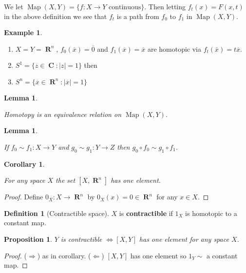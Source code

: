 \documentclass[10pt,]{article}
\newcommand{\terminology}[1]{\textbf{#1}}
\theoremstyle{plain}
\newtheorem{corollary}[theorem]{Corollary}
\newtheorem{lemma}[theorem]{Lemma}
\newtheorem{proposition}[theorem]{Proposition}
\theoremstyle{definition}
\newtheorem{definition}[theorem]{Definition}
\newtheorem{example}[theorem]{Example}
\DeclareMathOperator{\Map}{Map}
\DeclareMathOperator{\CC}{\mathbf{C}}
\DeclareMathOperator{\RR}{\mathbf{R}}
\begin{document}
                    We let \(\Map(X,Y) = \{f\colon X \to Y \text{ continuous}\}\).
                    Then letting \(f_t(x) = F(x,t)\) in the above definition we see that \(f_t\) is a
                    path from \(f_0\) to \(f_1\) in \(\Map(X,Y)\).
\begin{example}\label{example-1}
\begin{enumerate}
\item{}\(X = Y = \RR^n\), \(f_0(\overline{x}) = \overline{0}\) and \(f_1(\overline{x}) = \overline{x}\) are homotopic via \(f_t(\overline{x}) = t\overline{x}\).\item{}\(S^1 = \{z\in \CC : |z| = 1\}\) then \item{}\(S^n = \{ \overline{x} \in \RR^n : |\overline{x}| = 1\}\) \end{enumerate}
\end{example}
\begin{lemma}\label{lemma-1}

                        Homotopy is an equivalence relation on \(\Map(X,Y)\).
                    \end{lemma}
\label{notation-1}
\begin{lemma}\label{lemma-2}

                        If \(f_0 \sim f_1\colon X \to Y\) and \(g_0 \sim g_1\colon Y \to Z\) then
                        \(g_0\circ f_0 \sim g_1\circ f_1\).
                    \end{lemma}
\begin{corollary}\label{corollary-1}

                        For any space \(X\) the set \([X,\RR^n]\) has one element.
                    \end{corollary}
\begin{proof}

                        Define \(0_X\colon X \to \RR^n\) by \(0_X(x) = 0 \in \RR^n\) for any \(x\in X\).
                    \end{proof}
\begin{definition}[Contractible space]\label{definition-2}
\(X\) is \terminology{contractible} if \(1_X\) is homotopic to a constant map.
                    \end{definition}
\begin{proposition}\label{proposition-1}
\(Y\) is contractible \(\iff\)\([X,Y]\) has one element for any space \(X\).
                    \end{proposition}
\begin{proof}

                        (\(\Rightarrow\)) as in corollary.  (\(\Leftarrow\)) \([X,Y]\) has one element so
                        \(1_Y \sim \) a constant map.
                    \end{proof}
\par
\end{document}
